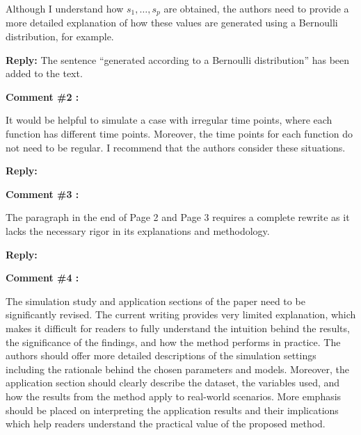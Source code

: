 \documentclass[11pt]{article}
\begin{document}
Although I understand how $s_1, \dots , s_p$ are obtained, the authors need to provide a more detailed explanation of how these values are generated using a Bernoulli distribution, for example.

\medskip

\normalfont

\textbf{Reply:} The sentence ``generated according to a Bernoulli distribution'' has been added to the text.


\bigskip

\itshape

\textbf{Comment \#2 :}

It would be helpful to simulate a case with irregular time points, where each function has different time points. Moreover, the time points for each function do not need to be regular. I recommend that the authors consider these situations.

\medskip

\normalfont

\textbf{Reply:}


\bigskip

\itshape


\textbf{Comment \#3 :}

The paragraph in the end of Page 2 and Page 3 requires a complete rewrite as it lacks the necessary rigor in its explanations and methodology.

\medskip

\normalfont

\textbf{Reply:}



\bigskip


\itshape


\textbf{Comment \#4 :}

The simulation study and application sections of the paper need to be significantly revised. The current writing provides very limited explanation, which makes it difficult for readers to fully understand the intuition behind the results, the significance of the findings, and how the method performs in practice. The authors should offer more detailed descriptions of the simulation settings including the rationale behind the chosen parameters and models. Moreover, the application section should clearly describe the dataset, the variables used, and how the results from the method apply to real-world scenarios. More emphasis should be placed on interpreting the application results and their implications which help readers understand the practical value of the proposed method.
\end{document}
